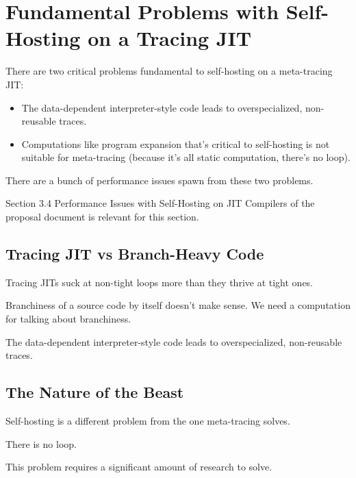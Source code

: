 \chapter{Fundamental Problems with Self-Hosting on a Tracing JIT}

	\begin{chapterpoint}
		There are two critical problems fundamental to self-hosting on a meta-tracing JIT:
		\begin{itemize}
			\item The data-dependent interpreter-style code leads to overspecialized, non-reusable traces.
			\item Computations like program expansion that's critical to self-hosting is not suitable for meta-tracing (because it's all static computation, there's no loop).
		\end{itemize}
		There are a bunch of performance issues spawn from these two problems.
	\end{chapterpoint}

	\begin{todo}[Import]
			Section 3.4 Performance Issues with Self-Hosting on JIT Compilers of the proposal document is relevant for this section.
	\end{todo}

	\section{Tracing JIT vs Branch-Heavy Code}
		\begin{mainpoint}
		 	Tracing JITs suck at non-tight loops more than they thrive at tight ones.

			Branchiness of a source code by itself doesn't make sense. We need a computation for talking about branchiness.

			The data-dependent interpreter-style code leads to overspecialized, non-reusable traces.
		\end{mainpoint}

	\section{The Nature of the Beast}
		\begin{mainpoint}
			Self-hosting is a different problem from the one meta-tracing solves.

			There is no loop.

			This problem requires a significant amount of research to solve.
		\end{mainpoint}
